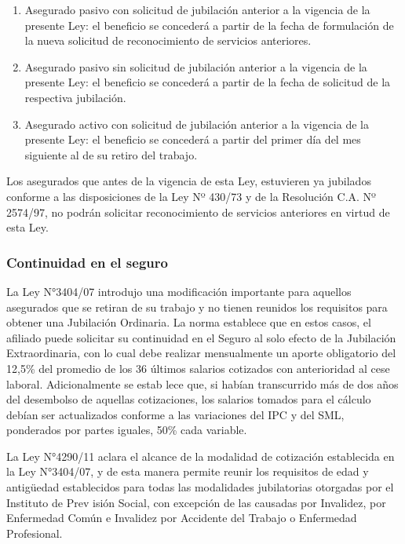 \begin{enumerate}[label=\alph*.]

\item Asegurado pasivo con solicitud de jubilación anterior a la vigencia de la presente Ley: el beneficio se concederá a partir de la fecha de formulación de la nueva solicitud de reconocimiento de servicios anteriores.

\item Asegurado pasivo sin solicitud de jubilación anterior a la vigencia de la presente Ley: el beneficio se concederá a partir de la fecha de solicitud de la respectiva jubilación.

\item Asegurado activo con solicitud de jubilación anterior a la vigencia de la presente Ley: el beneficio se concederá a partir del primer día del mes siguiente al de su retiro del trabajo.

\end{enumerate}

Los asegurados que antes de la vigencia de esta Ley, estuvieren ya
jubilados conforme a las disposiciones de la Ley Nº 430/73 y de la
Resolución C.A. Nº 2574/97, no podrán solicitar reconocimiento de
servicios anteriores en virtud de esta Ley.

\subsubsection{Continuidad en el seguro}

La Ley N°3404/07 introdujo una modificación importante para aquellos
asegurados que se retiran de su trabajo y no tienen reunidos los
requisitos para obtener una Jubilación Ordinaria. La norma establece que
en estos casos, el afiliado puede solicitar su continuidad en el Seguro
al solo efecto de la Jubilación Extraordinaria, con lo cual debe
realizar mensualmente un aporte obligatorio del 12,5\% del promedio de
los 36 últimos salarios cotizados con anterioridad al cese laboral.
Adicionalmente se estab lece que, si habían transcurrido más de dos años
del desembolso de aquellas cotizaciones, los salarios tomados para el
cálculo debían ser actualizados conforme a las variaciones del IPC y del
SML, ponderados por partes iguales, 50\% cada variable.

La Ley N°4290/11 aclara el alcance de la modalidad de cotización
establecida en la Ley N°3404/07, y de esta manera permite reunir los
requisitos de edad y antigüedad establecidos para todas las modalidades
jubilatorias otorgadas por el Instituto de Prev isión Social, con
excepción de las causadas por Invalidez, por Enfermedad Común e
Invalidez por Accidente del Trabajo o Enfermedad Profesional.

